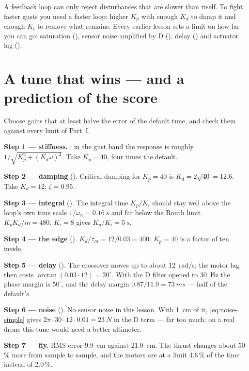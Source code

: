 \begin{keyidea}
A feedback loop can only reject disturbances that are slower than itself. To fight faster gusts you need a faster loop: higher $K_p$ with enough $K_d$ to damp it and enough $K_i$ to remove what remains. Every earlier lesson sets a limit on how far you can go: saturation (), sensor noise amplified by D (), delay () and actuator lag ().
\end{keyidea}

\section{A tune that wins — and a prediction of the score}

\begin{example}
\label{ex:challenge-tune}
Choose gains that at least halve the error of the default tune, and check them against every limit of Part~I.

\textbf{Step 1 — stiffness.} : in the gust band the response is roughly $1/\sqrt{K_p^2 + (K_d\omega)^2}$. Take $K_p = 40$, four times the default.

\textbf{Step 2 — damping} (). Critical damping for $K_p = 40$ is $K_d = 2\sqrt{40} = 12.6$. Take $K_d = 12$: $\zeta = 0.95$.

\textbf{Step 3 — integral} (). The integral time $K_p/K_i$ should stay well above the loop's own time scale $1/\omega_n = \SI{0.16}{s}$ and far below the Routh limit $K_pK_d/m = 480$. $K_i = 8$ gives $K_p/K_i = \SI{5}{s}$.

\textbf{Step 4 — the edge} (). $K_d/\tau_m = 12/0.03 = 400$: $K_p = 40$ is a factor of ten inside.

\textbf{Step 5 — delay} (). The crossover moves up to about \SI{12}{rad/s}; the motor lag then costs $\arctan(0.03 \cdot 12) = 20^\circ$. With the D filter opened to \SI{30}{Hz} the phase margin is $50^\circ$, and the delay margin $0.87/11.9 = \SI{73}{ms}$ — half of the default's.

\textbf{Step 6 — noise} (). No sensor noise in this lesson. With \SI{1}{cm} of it, \cref{eq:noise-simple} gives $2\pi \cdot 30 \cdot 12 \cdot 0.01 = \SI{23}{N}$ in the D term — far too much: on a real drone this tune would need a better altimeter.

\textbf{Step 7 — fly.} RMS error \SI{9.9}{cm} against \SI{21.0}{cm}. The thrust changes about 50\,\% more from sample to sample, and the motors are at a limit 4.6\,\% of the time instead of 2.0\,\%.
\end{example}

